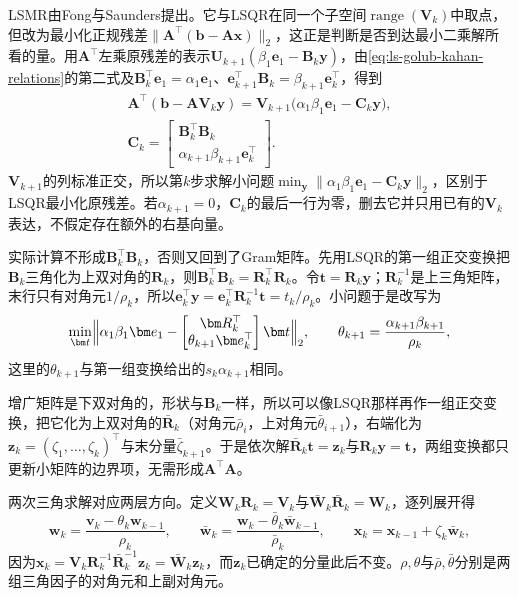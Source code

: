 LSMR由Fong与Saunders提出。它与LSQR在同一个子空间$\operatorname{range}(\bm V_k)$中取点，但改为最小化正规残差$\lVert\bm A^\top(\bm b-\bm A\bm x)\rVert_2$，这正是判断是否到达最小二乘解所看的量。用$\bm A^\top$左乘原残差的表示$\bm U_{k+1}(\beta_1\bm e_1-\bm B_k\bm y)$，由\eqref{eq:ls-golub-kahan-relations}的第二式及$\bm B_k^\top\bm e_1=\alpha_1\bm e_1$、$\bm e_{k+1}^\top\bm B_k=\beta_{k+1}\bm e_k^\top$，得到
\begin{equation}
 \begin{gathered}
 \bm A^\top(\bm b-\bm A\bm V_k\bm y)
 =\bm V_{k+1}\bigl(\alpha_1\beta_1\bm e_1-\bm C_k\bm y\bigr),\\
 \bm C_k=\begin{bmatrix}\bm B_k^\top\bm B_k\\ \alpha_{k+1}\beta_{k+1}\bm e_k^\top\end{bmatrix}.
 \end{gathered}
 \label{eq:ls-lsmr-subproblem}
\end{equation}
$\bm V_{k+1}$的列标准正交，所以第$k$步求解小问题$\min_{\bm y}\lVert\alpha_1\beta_1\bm e_1-\bm C_k\bm y\rVert_2$，区别于LSQR最小化原残差。若$\alpha_{k+1}=0$，$\bm C_k$的最后一行为零，删去它并只用已有的$\bm V_k$表达，不假定存在额外的右基向量。

实际计算不形成$\bm B_k^\top\bm B_k$，否则又回到了Gram矩阵。先用LSQR的第一组正交变换把$\bm B_k$三角化为上双对角的$\bm R_k$，则$\bm B_k^\top\bm B_k=\bm R_k^\top\bm R_k$。令$\bm t=\bm R_k\bm y$；$\bm R_k^{-1}$是上三角矩阵，末行只有对角元$1/\rho_k$，所以$\bm e_k^\top\bm y=\bm e_k^\top\bm R_k^{-1}\bm t=t_k/\rho_k$。小问题于是改写为
\[
 \min_{\bm t}\Bigl\lVert\alpha_1\beta_1\bm e_1-\begin{bmatrix}\bm R_k^\top\\ \theta_{k+1}\bm e_k^\top\end{bmatrix}\bm t\Bigr\rVert_2,\qquad
 \theta_{k+1}=\frac{\alpha_{k+1}\beta_{k+1}}{\rho_k},
\]
这里的$\theta_{k+1}$与第一组变换给出的$s_k\alpha_{k+1}$相同。

增广矩阵是下双对角的，形状与$\bm B_k$一样，所以可以像LSQR那样再作一组正交变换，把它化为上双对角的$\bar{\bm R}_k$（对角元$\bar\rho_i$，上对角元$\bar\theta_{i+1}$），右端化为$\bm z_k=(\zeta_1,\ldots,\zeta_k)^\top$与末分量$\bar\zeta_{k+1}$。于是依次解$\bar{\bm R}_k\bm t=\bm z_k$与$\bm R_k\bm y=\bm t$，两组变换都只更新小矩阵的边界项，无需形成$\bm A^\top\bm A$。

两次三角求解对应两层方向。定义$\bm W_k\bm R_k=\bm V_k$与$\bar{\bm W}_k\bar{\bm R}_k=\bm W_k$，逐列展开得
\[
 \bm w_k=\frac{\bm v_k-\theta_k\bm w_{k-1}}{\rho_k},\qquad
 \bar{\bm w}_k=\frac{\bm w_k-\bar\theta_k\bar{\bm w}_{k-1}}{\bar\rho_k},\qquad
 \bm x_k=\bm x_{k-1}+\zeta_k\bar{\bm w}_k ,
\]
因为$\bm x_k=\bm V_k\bm R_k^{-1}\bar{\bm R}_k^{-1}\bm z_k=\bar{\bm W}_k\bm z_k$，而$\bm z_k$已确定的分量此后不变。$\rho,\theta$与$\bar\rho,\bar\theta$分别是两组三角因子的对角元和上副对角元。

